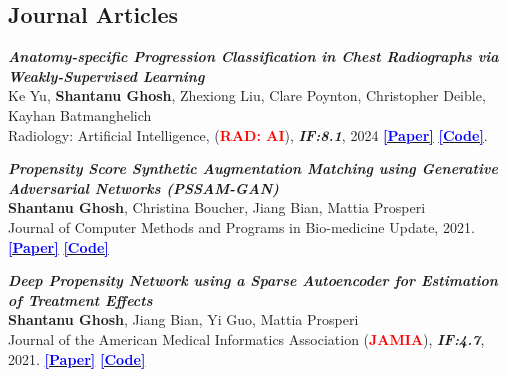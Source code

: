 \subsection{Journal Articles}
  \printbibliography[heading=none,type=article,keyword=journal,
    resetnumbers=true,prefixnumbers=J]
    \begin{enumerate}[label=\texttt{[J\arabic*]}, start=3]
        \item{\textit{\textbf{Anatomy-specific Progression Classification in Chest Radiographs via Weakly-Supervised Learning}}  
        \\ Ke Yu, \textbf{Shantanu Ghosh}, Zhexiong Liu, Clare Poynton, Christopher Deible, Kayhan Batmanghelich
        \\Radiology: Artificial Intelligence, (\textbf{\textcolor{red}{RAD: AI}}), \textbf{\textit{IF:8.1}}, 2024} \href{https://pubs.rsna.org/doi/10.1148/ryai.230277}
        {\textbf{\textcolor{blue}{[Paper]}}}
        \href{https://github.com/batmanlab/SiameseAGXNet/tree/main}
        {\textbf{\textcolor{blue}{[Code]}}}.

        \addtocounter{enumi}{-2}
        \item{\textit{\textbf{Propensity Score Synthetic Augmentation Matching using Generative Adversarial Networks (PSSAM-GAN)}}  
        \\\textbf{Shantanu Ghosh}, Christina Boucher, Jiang Bian, Mattia Prosperi
        \\Journal of Computer Methods and Programs in Bio-medicine Update, 2021}. \href{https://www.sciencedirect.com/science/article/pii/S2666990021000197/}
        {\textbf{\textcolor{blue}{[Paper]}}}
        \href{https://github.com/shantanu-ai/PSSAM-GAN}
        {\textbf{\textcolor{blue}{[Code]}}}

        \addtocounter{enumi}{-2}
        \item \textit{\textbf{Deep Propensity Network using a Sparse Autoencoder for Estimation of Treatment Effects}}
        \\\textbf{Shantanu Ghosh}, Jiang Bian, Yi Guo, Mattia Prosperi 
        \\Journal of the American Medical Informatics Association (\textcolor{red}{\textbf{JAMIA}}), \textbf{\textit{IF:4.7}}, 2021. 
        \href{https://academic.oup.com/jamia/article-abstract/28/6/1197/6139936}
        {\textbf{\textcolor{blue}{[Paper]}}}
        \href{https://github.com/shantanu-ai/DPN-SA}
        {\textbf{\textcolor{blue}{[Code]}}}
       \end{enumerate}
